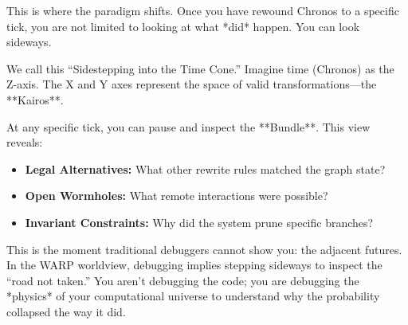 This is where the paradigm shifts. Once you have rewound Chronos to a specific tick, you are not limited to looking at what *did* happen. You can look sideways.

We call this ``Sidestepping into the Time Cone.'' Imagine time (Chronos) as the Z-axis. The X and Y axes represent the space of valid transformations—the **Kairos**.

\begin{center}
\end{center}

At any specific tick, you can pause and inspect the **Bundle**. This view reveals:
\begin{itemize}
    \item \textbf{Legal Alternatives:} What other rewrite rules matched the graph state?
    \item \textbf{Open Wormholes:} What remote interactions were possible?
    \item \textbf{Invariant Constraints:} Why did the system prune specific branches?
\end{itemize}

This is the moment traditional debuggers cannot show you: the adjacent futures. In the WARP worldview, debugging implies stepping sideways to inspect the ``road not taken.'' You aren't debugging the code; you are debugging the *physics* of your computational universe to understand why the probability collapsed the way it did.

